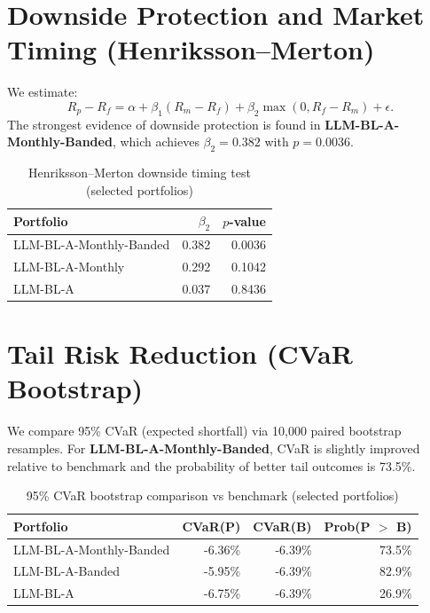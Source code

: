 \documentclass[12pt]{report}
\begin{document}
\section{Downside Protection and Market Timing (Henriksson--Merton)}
We estimate:
\begin{equation}
    R_p - R_f = \alpha + \beta_1(R_m - R_f) + \beta_2\max(0, R_f - R_m) + \epsilon.
\end{equation}
The strongest evidence of downside protection is found in \textbf{LLM-BL-A-Monthly-Banded}, which achieves $\beta_2 = 0.382$ with $p=0.0036$.

\begin{table}[H]
    \centering
    \caption{Henriksson--Merton downside timing test (selected portfolios)}
    \label{tab:hm}
    \begin{tabular}{lrr}
        \toprule
        Portfolio               & $\beta_2$ & $p$-value \\
        \midrule
        LLM-BL-A-Monthly-Banded & 0.382     & 0.0036    \\
        LLM-BL-A-Monthly        & 0.292     & 0.1042    \\
        LLM-BL-A                & 0.037     & 0.8436    \\
        \bottomrule
    \end{tabular}
\end{table}

\section{Tail Risk Reduction (CVaR Bootstrap)}
We compare 95\% CVaR (expected shortfall) via 10{,}000 paired bootstrap resamples.
For \textbf{LLM-BL-A-Monthly-Banded}, CVaR is slightly improved relative to benchmark and the probability of better tail outcomes is 73.5\%.

\begin{table}[H]
    \centering
    \caption{95\% CVaR bootstrap comparison vs benchmark (selected portfolios)}
    \label{tab:cvar}
    \begin{tabular}{lrrr}
        \toprule
        Portfolio               & CVaR(P) & CVaR(B) & Prob(P $>$ B) \\
        \midrule
        LLM-BL-A-Monthly-Banded & -6.36\% & -6.39\% & 73.5\%        \\
        LLM-BL-A-Banded         & -5.95\% & -6.39\% & 82.9\%        \\
        LLM-BL-A                & -6.75\% & -6.39\% & 26.9\%        \\
        \bottomrule
    \end{tabular}
\end{table}
\end{document}

